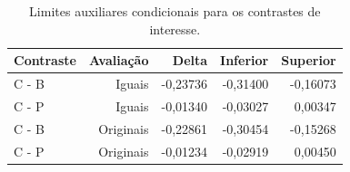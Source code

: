 \begin{table}[htbp]
\centering\small
\caption{Limites auxiliares condicionais para os contrastes de interesse.}
\label{tab:incerteza}
\begin{tabular}{lrrrr}
\toprule
Contraste & Avaliação & Delta & Inferior & Superior \\
\midrule
C - B & Iguais & -0,23736 & -0,31400 & -0,16073 \\
C - P & Iguais & -0,01340 & -0,03027 & 0,00347 \\
C - B & Originais & -0,22861 & -0,30454 & -0,15268 \\
C - P & Originais & -0,01234 & -0,02919 & 0,00450 \\
\bottomrule
\end{tabular}
\end{table}
